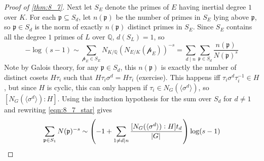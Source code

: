 \documentclass[11pt]{article}
\theoremstyle{definition}
\theoremstyle{plain}
\theoremstyle{remark}
\renewcommand{\qedsymbol}{$\blacksquare$}
\newcommand{\QQ}{\mathbb{Q}}
\newcommand{\cp}{\mathcal{p}}
\newcommand{\fp}{\mathfrak{p}}
\begin{document}
\begin{proof}[Proof of \autoref{thm:8_7}]
    Next let $S_E$ denote the primes of $E$ having inertial degree $1$ over $K$. For each $\fp \subseteq S_d$, let $n(\fp)$ be the number of primes in $S_E$ lying above $\fp$, so $\fp \in S_d$ is the norm of exactly $n(\fp)$ distinct primes in $S_E$. Since $S_E$ contains all the degree $1$ primes of $L$ over $\QQ$, $d(S_L) = 1$, so 
    \begin{equation}\label{eqn:8_7_star}
        -\log(s-1) \sim \sum_{\cp_E \in S_E} N_{K/\QQ}(N_{E/K}(\cp_E))^{-s} = \sum_{d \mid n} \sum_{\fp \in S_d} \frac{n(\fp)}{N(\fp)^s}
    \end{equation}
    Note by Galois theory, for any $\fp \in S_d$, this $n(\fp)$ is exactly the number of distinct cosets $H \tau_i$ such that $H \tau_i \sigma^d = H \tau_i$ (exercise). This happens iff $\tau_i \sigma^d \tau_i^{-1} \in H$, but since $H$ is cyclic, this can only happen if $\tau_i \in N_G(\langle \sigma^d \rangle)$, so $[N_G(\langle \sigma^d \rangle) : H]$. Using the induction hypothesis for the sum over $S_d$ for $d \neq 1$ and rewriting \eqref{eqn:8_7_star} gives
    \begin{equation*}
        [N_G(H) : H] \sum_{\fp \in S_1} N(\fp)^{-s} \sim \left(-1 + \sum_{1 \neq d \mid n} \frac{[N_G(\langle \sigma^d \rangle) : H] t_d}{\abs{G}}\right) \log(s-1)
    \end{equation*}
    \renewcommand{\qedsymbol}{}
\end{proof}
\end{document}
